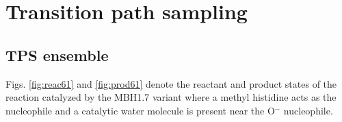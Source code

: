 \documentclass[%
preprint,
 amsmath,amssymb,
 aps,
prb,
]{revtex4-2}
\begin{document}

\section{Transition path sampling}
\subsection{TPS ensemble}
Figs. \ref{fig:reac61} and \ref{fig:prod61} denote the reactant and product states of the 
reaction catalyzed by the MBH1.7 variant where a methyl histidine acts as the nucleophile 
and a catalytic water molecule is present near the O$^{-}$ nucleophile.  
\end{document}
